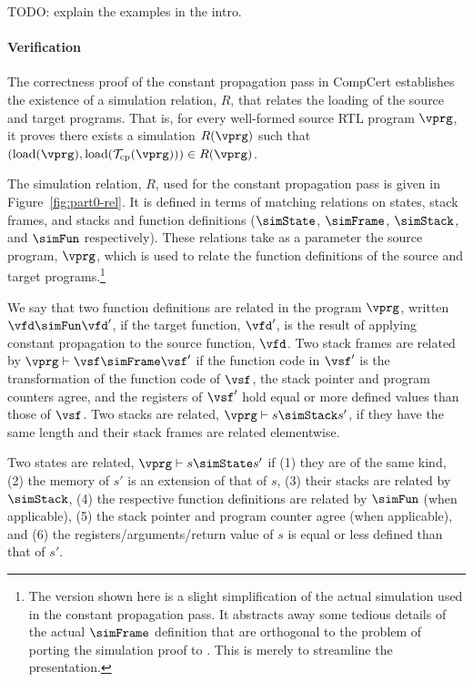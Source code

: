 % 

TODO: explain the examples in the intro.



\paragraph{Verification}

The correctness proof of the constant propagation pass in CompCert establishes 
the existence of a simulation relation, $R$, that relates the loading of the source and target programs.
That is, for every well-formed source RTL program $\vprg$, it proves 
there exists a simulation $R(\vprg)$ such that 
$(\mathrm{load}(\vprg),\mathrm{load}(\mathcal{T}_\mathrm{cp}(\vprg)))\in R(\vprg)$.

The simulation relation, $R$, used for the constant propagation pass
is given in Figure~\ref{fig:part0-rel}.  It is defined in terms of
matching relations on states, stack frames, and stacks and function
definitions ($\simState$, $\simFrame$, $\simStack$, and $\simFun$
respectively).  These relations take as a parameter the source
program, $\vprg$, which is used to relate the function definitions of
the source and target programs.\footnote{The version shown here is a
  slight simplification of the actual simulation used in the constant
  propagation pass.  It abstracts away some tedious details of the
  actual $\simFrame$ definition that are orthogonal to the problem of
  porting the simulation proof to \sepcomp{}.  This is merely to
  streamline the presentation.}

We say that two function definitions are related in the program $\vprg$, written $\vfd \simFun \vfd'$, 
if the target function, $\vfd'$, is the result of applying constant propagation to the source function, $\vfd$.
Two stack frames are related by $\vprg \vdash \vsf\simFrame \vsf'$ if 
the function code in $\vsf'$ is the transformation of the function code of $\vsf$,
the stack pointer and program counters agree, and
the registers of $\vsf'$ hold equal or more defined values than those of $\vsf$.
Two stacks are related, $\vprg \vdash s\simStack s'$, if they have the same length and their stack frames are related elementwise.

% 

Two states are related, $\vprg \vdash s \simState s'$
if (1) they are of the same kind, 
(2) the memory of $s'$ is an extension of that of $s$, 
(3) their stacks are related by $\simStack$,
(4) the respective function definitions are related by $\simFun$ (when applicable),
(5) the stack pointer and program counter agree (when applicable), and
(6) the registers/arguments/return value of $s$ is equal or less defined than that of $s'$. 

